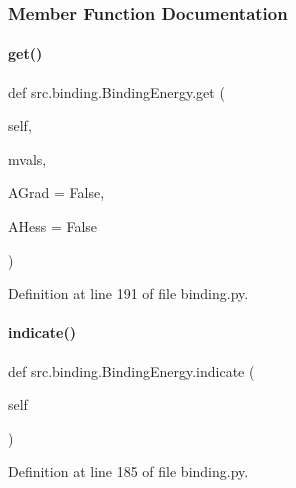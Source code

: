 \subsubsection{Member Function Documentation}
\mbox{\label{classsrc_1_1binding_1_1BindingEnergy_a96467ec6f26522876e04e4782413602a}} 
\paragraph{\texorpdfstring{get()}{get()}}
{\footnotesize\ttfamily def src.\+binding.\+Binding\+Energy.\+get (\begin{DoxyParamCaption}\item[{}]{self,  }\item[{}]{mvals,  }\item[{}]{A\+Grad = {\ttfamily False},  }\item[{}]{A\+Hess = {\ttfamily False} }\end{DoxyParamCaption})}



Definition at line 191 of file binding.\+py.

\mbox{\label{classsrc_1_1binding_1_1BindingEnergy_a21124a9de77db1f3c04d6bdbefcb0b22}} 
\paragraph{\texorpdfstring{indicate()}{indicate()}}
{\footnotesize\ttfamily def src.\+binding.\+Binding\+Energy.\+indicate (\begin{DoxyParamCaption}\item[{}]{self }\end{DoxyParamCaption})}



Definition at line 185 of file binding.\+py.

